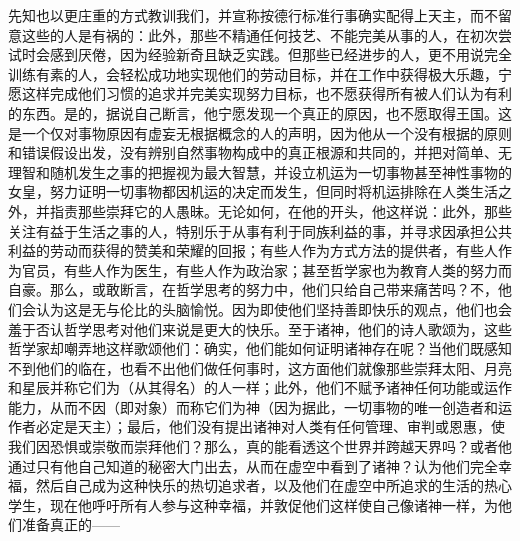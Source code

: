 \par

\par

先知也以更庄重的方式教训我们，并宣称按德行标准行事确实配得上天主，而不留意这些的人是有祸的：此外，那些不精通任何技艺、不能完美从事的人，在初次尝试时会感到厌倦，因为经验新奇且缺乏实践。但那些已经进步的人，更不用说完全训练有素的人，会轻松成功地实现他们的劳动目标，并在工作中获得极大乐趣，宁愿这样完成他们习惯的追求并完美实现努力目标，也不愿获得所有被人们认为有利的东西。是的，据说自己断言，他宁愿发现一个真正的原因，也不愿取得王国。这是一个仅对事物原因有虚妄无根据概念的人的声明，因为他从一个没有根据的原则和错误假设出发，没有辨别自然事物构成中的真正根源和共同的，并把对简单、无理智和随机发生之事的把握视为最大智慧，并设立机运为一切事物甚至神性事物的女皇，努力证明一切事物都因机运的决定而发生，但同时将机运排除在人类生活之外，并指责那些崇拜它的人愚昧。无论如何，在他的开头，他这样说：此外，那些关注有益于生活之事的人，特别乐于从事有利于同族利益的事，并寻求因承担公共利益的劳动而获得的赞美和荣耀的回报；有些人作为方式方法的提供者，有些人作为官员，有些人作为医生，有些人作为政治家；甚至哲学家也为教育人类的努力而自豪。那么，或敢断言，在哲学思考的努力中，他们只给自己带来痛苦吗？不，他们会认为这是无与伦比的头脑愉悦。因为即使他们坚持善即快乐的观点，他们也会羞于否认哲学思考对他们来说是更大的快乐。至于诸神，他们的诗人歌颂为，这些哲学家却嘲弄地这样歌颂他们：确实，他们能如何证明诸神存在呢？当他们既感知不到他们的临在，也看不出他们做任何事时，这方面他们就像那些崇拜太阳、月亮和星辰并称它们为（从其得名）的人一样；此外，他们不赋予诸神任何功能或运作能力，从而不因（即对象）而称它们为神（因为据此，一切事物的唯一创造者和运作者必定是天主）；最后，他们没有提出诸神对人类有任何管理、审判或恩惠，使我们因恐惧或崇敬而崇拜他们？那么，真的能看透这个世界并跨越天界吗？或者他通过只有他自己知道的秘密大门出去，从而在虚空中看到了诸神？认为他们完全幸福，然后自己成为这种快乐的热切追求者，以及他们在虚空中所追求的生活的热心学生，现在他呼吁所有人参与这种幸福，并敦促他们这样使自己像诸神一样，为他们准备真正的——